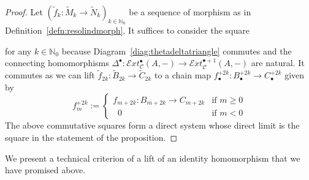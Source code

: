 \documentclass[12pt,a4paper]{article}
\numberwithin{equation}{section}
\theoremstyle{nonumberplain}
\newtheorem{proof}{Proof}
\begin{document}
\begin{proof}
Let $(\widetilde{f}_k: \widetilde{M}_k \rightarrow \widetilde{N}_k)_{k \in \mathbb{N}_0}$ be a sequence of morphism as in Definition~\ref{defn:resolindmorph}. It suffices to consider the square
\begin{center}
\end{center}
for any $k \in \mathbb{N}_0$ because Diagram~\ref{diag:thetadeltatriangle} commutes and the connecting homomorphisms $\Delta^{\bullet}: \mathcal{E}xt_{\mathcal{C}}^{\bullet}(A, -) \rightarrow \mathcal{E}xt_{\mathcal{C}}^{\bullet+1}(A, -)$ are natural. It commutes as we can lift $\widetilde{f}_{2k}: \widetilde{B}_{2k} \rightarrow \widetilde{C}_{2k}$ to a chain map $f_{\bullet}^{+2k}: B_{\bullet}^{+2k} \rightarrow C_{\bullet}^{+2k}$ given by
\[ f_m^{+2k} := \begin{cases} f_{m+2k}: B_{m+2k} \rightarrow C_{m+2k} &\text{if } m \geq 0 \\ \; \; 0 &\text{if } m < 0  \end{cases} \]
The above commutative squares form a direct system whose direct limit is the square in the statement of the proposition.
\end{proof}

We present a technical criterion of a lift of an identity homomorphism that we have promised above.
\end{document}
